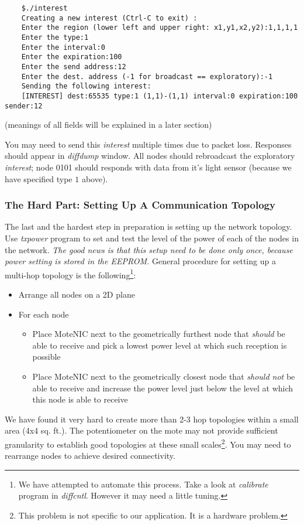 \documentclass[11pt,onecolumn]{article}
\begin{document}
\begin{verbatim}
	$./interest 
	Creating a new interest (Ctrl-C to exit) :
	Enter the region (lower left and upper right: x1,y1,x2,y2):1,1,1,1
	Enter the type:1
	Enter the interval:0
	Enter the expiration:100
	Enter the send address:12
	Enter the dest. address (-1 for broadcast == exploratory):-1
	Sending the following interest:
	[INTEREST] dest:65535 type:1 (1,1)-(1,1) interval:0 expiration:100 sender:12
\end{verbatim}
(meanings of all fields will be explained in a later section)

You may need to send this \emph{interest} multiple times due to packet
loss. Responses should appear in \emph{diffdump} window. All nodes
should rebroadcast the exploratory \emph{interest}; node 0101 should
responds with data from it's light sensor (because we have specified
type $1$ above).

\subsubsection{The Hard Part: Setting Up A Communication Topology}
The last and the hardest step in preparation is setting up the network
topology. Use \emph{txpower} program to set and test the level of the
power of each of the nodes in the network. \emph{The good news is that
this setup need to be done only once, because power setting is stored
in the EEPROM.} General procedure for setting up a multi-hop topology is
the following\footnote{We have attempted to automate this
process. Take a look at \emph{calibrate} program in
\emph{diffcntl}. However it may need a little tuning.}:
\begin{itemize}
	\item Arrange all nodes on a 2D plane
	\item For each node
	\begin{itemize}
		\item Place MoteNIC next to the geometrically furthest node
		that \emph{should} be able to receive and pick a lowest power
		level at which such reception is possible

		\item Place MoteNIC next to the geometrically closest node
		that \emph{should not} be able to receive and increase the
		power level just below the level at which this node is able to
		receive 
	\end{itemize}
\end{itemize}

We have found it very hard to create more than 2-3 hop topologies
within a small area (4x4 sq. ft.). The potentiometer on the mote may not provide
sufficient granularity to establish good topologies at these small
scales\footnote{This problem is not specific to our application. It is
a hardware problem.}. You may need to rearrange nodes to achieve
desired connectivity.
\end{document}
